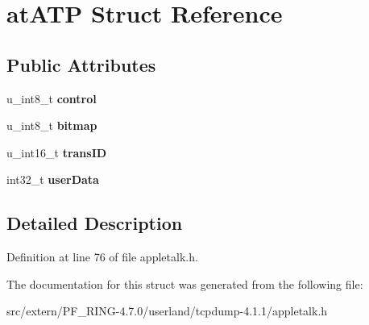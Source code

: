 \hypertarget{structat_a_t_p}{
\section{atATP Struct Reference}
\label{structat_a_t_p}
}
\subsection*{Public Attributes}
\begin{DoxyCompactItemize}
\item 
\hypertarget{structat_a_t_p_a91be49e97a21b39335c95faecc2bdcf6}{
u\_\-int8\_\-t {\bfseries control}}
\label{structat_a_t_p_a91be49e97a21b39335c95faecc2bdcf6}

\item 
\hypertarget{structat_a_t_p_add96a7fd9bf9cf23f3b07205db2accb5}{
u\_\-int8\_\-t {\bfseries bitmap}}
\label{structat_a_t_p_add96a7fd9bf9cf23f3b07205db2accb5}

\item 
\hypertarget{structat_a_t_p_ab572af41b86b3d2ef38365bb58448652}{
u\_\-int16\_\-t {\bfseries transID}}
\label{structat_a_t_p_ab572af41b86b3d2ef38365bb58448652}

\item 
\hypertarget{structat_a_t_p_a21f1af459930418116539406dcf0f255}{
int32\_\-t {\bfseries userData}}
\label{structat_a_t_p_a21f1af459930418116539406dcf0f255}

\end{DoxyCompactItemize}


\subsection{Detailed Description}


Definition at line 76 of file appletalk.h.



The documentation for this struct was generated from the following file:\begin{DoxyCompactItemize}
\item 
src/extern/PF\_\-RING-\/4.7.0/userland/tcpdump-\/4.1.1/appletalk.h\end{DoxyCompactItemize}
